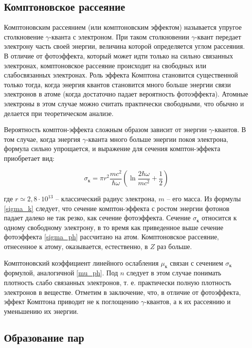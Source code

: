 \subsection*{Комптоновское рассеяние}

    Комптоновским рассеянием (или комптоновским эффектом) называется упругое столкновение $\gamma$-кванта с электроном. При таком столкновении $\gamma$-квант передает электрону часть своей энергии, величина которой определяется углом рассеяния. В отличие от фотоэффекта, который может идти только на сильно связанных электронах, комптоновское рассеяние происходит на свободных или слабосвязанных электронах. Роль эффекта Комптона становится
	существенной только тогда, когда энергия квантов становится много больше энергии связи электронов в атоме (когда достаточно падает вероятность фотоэффекта). Атомные электроны в этом случае можно считать практически свободными, что обычно и делается при теоретическом анализе.
	
	Вероятность комптон-эффекта сложным образом зависит от энергии $\gamma$-квантов. В том случае, когда энергия
	$\gamma$-кванта много больше энергии покоя электрона, формула сильно
	упрощается, и выражение для сечения комптон-эффекта приобретает вид:
	
	\begin{equation}
        \label{sigma_k}
	    \sigma_{\text{к}} = \pi r^2 \dfrac{mc^2}{\hbar\omega} \left( \ln{\dfrac{2\hbar\omega}{mc^2} + \dfrac{1}{2}} \right) 
	\end{equation}
	
	где $r \simeq 2,8 \cdot 10^{13}$ -- классический радиус электрона, $m$ -- его масса. Из формулы \eqref{sigma_k} следует, что сечение комптон-эффекта с ростом энергии фотонов падает далеко не так резко, как сечение фотоэффекта.
	Сечение $\sigma_{\text{к}}$ относится к одному свободному электрону, в то время как приведенное выше сечение фотоэффекта \eqref{sigma_ph} рассчитано на атом. Комптоновское рассеяние, отнесенное к атому, оказывается, естественно, в $Z$ раз больше. 
	
	Комптоновский коэффициент линейного ослабления $ \mu_{\text{к}} $ связан с сечением $\sigma_{\text{к}}$ формулой, аналогичной \eqref{mu_ph}. Под $n$ следует в этом случае понимать плотность слабо связанных электронов, т. е. практически полную плотность электронов в веществе.
	Отметим в заключение, что, в отличие от фотоэффекта, эффект Комптона приводит не к поглощению $\gamma$-квантов, а к их рассеянию и уменьшению их энергии.
	
\subsection*{Образование пар}
	
